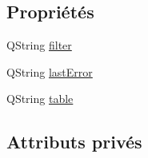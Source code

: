 \subsection*{Propriétés}
\begin{DoxyCompactItemize}
\item 
Q\-String \hyperlink{classSimpleHotel_1_1SH__SqlDataModel_ae7c93067c3e3fbbff663a407d4e8e4b4}{filter}
\item 
Q\-String \hyperlink{classSimpleHotel_1_1SH__SqlDataModel_a5e015924c30fd496188d553ea5f84f93}{last\-Error}
\item 
Q\-String \hyperlink{classSimpleHotel_1_1SH__SqlDataModel_a79f69cfc95a9f02277a148d7511e1f82}{table}
\end{DoxyCompactItemize}
\subsection*{Attributs privés}
